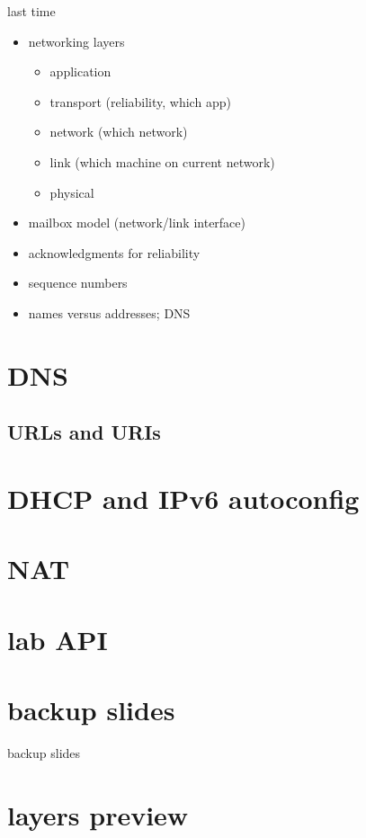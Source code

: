 \date{}
\title{}
\date{}

\begin{frame}
    \titlepage
\end{frame}

\begin{frame}{last time}
    \begin{itemize}
    \item networking layers
        \begin{itemize}
        \item application
        \item transport (reliability, which app)
        \item network (which network)
        \item link (which machine on current network)
        \item physical
        \end{itemize}
    \item mailbox model (network/link interface)
    \item acknowledgments for reliability
    \item sequence numbers
    \item names versus addresses; DNS
    \end{itemize}
\end{frame}

\section{DNS}



\subsection{URLs and URIs}



\section{DHCP and IPv6 autoconfig}


\section{NAT}


\section{lab API}




\section{backup slides}
\begin{frame}{backup slides}
\end{frame}
\section{layers preview}




